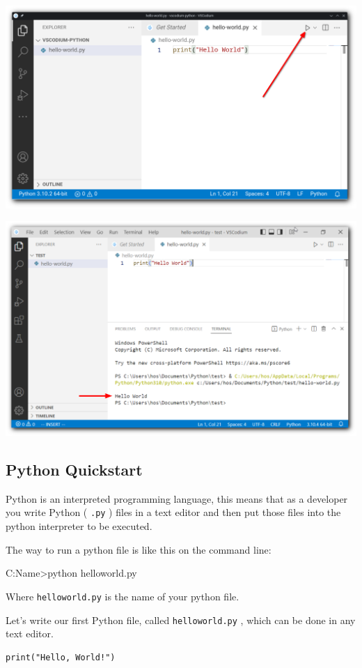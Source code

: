 \documentclass[12pt,a4paper]{article}
\newcommand{\code}[1]{%
	\colorbox{backcolour}{\lstinline{#1}}%
}
\begin{document}
\begin{center}
	\includegraphics[width=.8\textwidth]{shots/installation/vscodium-run.png}

	\includegraphics[width=.8\textwidth]{shots/installation/vscodium-run-output.png}
\end{center}
\subsection{Python Quickstart}
Python is an interpreted programming language, this means that as a developer
you write Python (\code{.py}) files in a text editor and then put those files into the
python interpreter to be executed.

The way to run a python file is like this on the command line:

\begin{vercode}
C:\Users\Your Name>python helloworld.py
\end{vercode}

Where \code{helloworld.py} is the name of your python file.

Let's write our first Python file, called \code{helloworld.py},
which can be done in any text editor.

\begin{ebox}
\begin{lstlisting}
print("Hello, World!")
\end{lstlisting}
\end{ebox}
\end{document}
